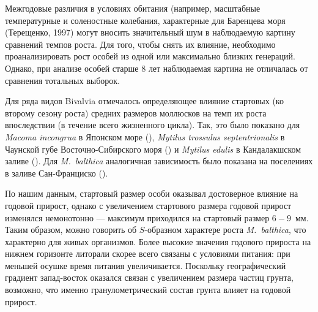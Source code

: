 Межгодовые различия в условиях обитания (например, масштабные температурные и соленостные колебания, характерные для Баренцева моря (Терещенко, 1997) могут вносить значительный шум в наблюдаемую картину сравнений темпов роста. 
Для того, чтобы снять их влияние, необходимо проанализировать рост особей из одной или максимально близких генераций. 
Однако, при анализе особей старше 8 лет наблюдаемая картина не отличалась от сравнения тотальных выборок.

Для ряда видов Bivalvia отмечалось определяющее влияние стартовых (ко второму сезону роста) средних размеров моллюсков на темп их роста впоследствии (в течение всего жизненного цикла). 
Так, это было показано для {\it Macoma incongrua}  в Японском море (\cite{Maximovich_Lysenko_1986}), {\it Mytilus trossulus septentrionalis} в Чаунской губе Восточно-Сибирского моря (\cite{Gagaev_et_al_1994}) и {\it Mytilus edulis} в Кандалакшском заливе (\cite{Maximovich_et_al_1993}). 
Для {\it M.~balthica} аналогичная зависимость было показана на поселениях в заливе Сан-Франциско (\cite{Cloern_Nichols_1978}). 

По нашим данным, стартовый размер особи оказывал достоверное влияние на годовой прирост, однако с увеличением стартового размера годовой прирост изменялся немонотонно — максимум приходился на стартовый размер $6-9$~мм. 
Таким образом, можно говорить об $S$-образном характере роста  {\it M.~balthica}, что характерно для живых организмов.
Более высокие значения годового прироста на нижнем горизонте литорали скорее всего связаны с условиями питания: при меньшей осушке время питания увеличивается.
Поскольку географический градиент запад-восток оказался связан с увеличением размера частиц грунта, возможно, что именно гранулометрический состав грунта влияет на годовой прирост. 





\afterpage{\clearpage}

\par\bigskip

